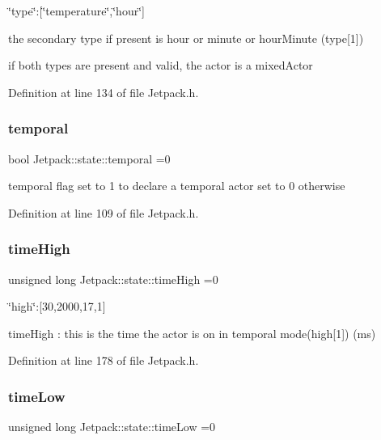 \char`\"{}type\char`\"{}\+:\mbox{[}\char`\"{}temperature\char`\"{},\char`\"{}hour\char`\"{}\mbox{]}

the secondary type if present is hour or minute or hour\+Minute (type\mbox{[}1\mbox{]})

if both types are present and valid, the actor is a mixed\+Actor 

Definition at line 134 of file Jetpack.\+h.

\mbox{\label{struct_jetpack_1_1state_abd6039e7a48856550b0ffbf8bcff7bdd}} 
\subsubsection{\texorpdfstring{temporal}{temporal}}
{\footnotesize\ttfamily bool Jetpack\+::state\+::temporal =0}

temporal flag set to 1 to declare a temporal actor set to 0 otherwise 

Definition at line 109 of file Jetpack.\+h.

\mbox{\label{struct_jetpack_1_1state_a97c594b20b03b46ae0a6ac544f5d6c8d}} 
\subsubsection{\texorpdfstring{time\+High}{timeHigh}}
{\footnotesize\ttfamily unsigned long Jetpack\+::state\+::time\+High =0}

\char`\"{}high\char`\"{}\+:\mbox{[}30,2000,17,1\mbox{]}

time\+High \+: this is the time the actor is on in temporal mode(high\mbox{[}1\mbox{]}) (ms) 

Definition at line 178 of file Jetpack.\+h.

\mbox{\label{struct_jetpack_1_1state_ae544475d627308218e355a8dbb28ac74}} 
\subsubsection{\texorpdfstring{time\+Low}{timeLow}}
{\footnotesize\ttfamily unsigned long Jetpack\+::state\+::time\+Low =0}

